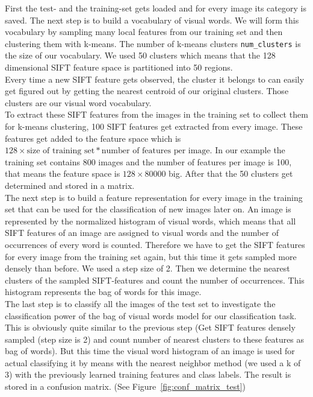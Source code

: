 \documentclass[subfigure,epsfig,fleqn,float,numbers=noenddot]{scrartcl}
\begin{document}
First the test- and the training-set gets loaded and for every image its category is saved. The next step is to build a vocabulary
of visual words. We will form this vocabulary by sampling many local features from our training set and then clustering them with k-means. The number of k-means clusters \texttt{num\_clusters} is the size of our vocabulary. We used 50 clusters which means that the 128 dimensional SIFT feature space is partitioned into 50 regions.\\
Every time a new SIFT feature gets observed, the cluster it belongs to can easily get figured out by getting the nearest centroid of our original clusters. Those clusters are our visual word vocabulary.\\
To extract these SIFT features from the images in the training set to collect them for k-means clustering, 100 SIFT features get extracted from every image. These features get added to the feature space which is $128 \times \mbox{size of training set}*\mbox{number of features per image}$. In our example the training set contains 800 images and the number of features per image is 100, that means the feature space is $128 \times 80000$ big. After that the 50 clusters get determined and stored in a matrix.\\
The next step is to build a feature representation for every image in the training set that can be used for the classification of new images later on. An image is represented by the normalized histogram of visual words, which means that all SIFT features of an image are assigned to visual words and the number of occurrences of every word is counted. Therefore we have to get the SIFT features for every image from the training set again, but this time it gets sampled more densely than before. We used a step size of 2. Then we determine the nearest clusters of the sampled SIFT-features and count the number of occurrences. This histogram represents the bag of words for this image.\\
The last step is to classify all the images of the test set to investigate the classification power of the bag of visual words model for our classification task. This is obviously quite similar to the previous step (Get SIFT features densely sampled (step size is 2) and count number of nearest clusters to these features as bag of words). But this time the visual word histogram of an image is used for actual classifying it by means with the nearest neighbor method (we used a k of 3) with the previously learned training features and class labels. The result is stored in a confusion matrix. (See Figure~\ref{fig:conf_matrix_test})
\end{document}
